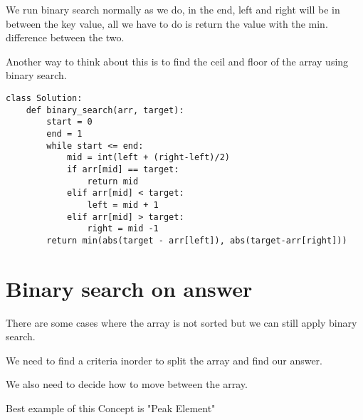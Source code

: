 \documentclass[24pt, a4]{article}
\begin{document}
We run binary search normally as we do, in the end, left and right will be 
in between the key value, all we have to do is return the value with the min.
difference between the two.

Another way to think about this is to find the ceil and floor of the array
using binary search.

\begin{lstlisting}
class Solution:
    def binary_search(arr, target):
        start = 0
        end = 1
        while start <= end:
            mid = int(left + (right-left)/2)
            if arr[mid] == target:
                return mid
            elif arr[mid] < target:
                left = mid + 1
            elif arr[mid] > target:
                right = mid -1
        return min(abs(target - arr[left]), abs(target-arr[right]))
\end{lstlisting}

\section{Binary search on answer}

There are some cases where the array is not sorted but we can still apply
binary search.

We need to find a criteria inorder to split the array and find our answer.

We also need to decide how to move between the array.

Best example of this Concept is "Peak Element"
\end{document}
